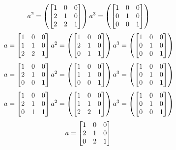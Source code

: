 \begin{mdframed}[style=darkAnswer,frametitle={Joe Starr}]
\begin{itemize}
{$$a^{ 2 }=\left( \begin{bmatrix}1&0&0\\2&1&0\\2&2&1\end{bmatrix} \right)
a^{ 3 }=\left( \begin{bmatrix}1&0&0\\0&1&0\\0&0&1\end{bmatrix} \right)
$$ $$
a= \begin{bmatrix}1&0&0\\1&1&0\\2&2&1\end{bmatrix} \\
a^{ 2 }=\left( \begin{bmatrix}1&0&0\\2&1&0\\0&1&1\end{bmatrix} \right)
a^{ 3 }=\left( \begin{bmatrix}1&0&0\\0&1&0\\0&0&1\end{bmatrix} \right)
$$ $$
a= \begin{bmatrix}1&0&0\\2&1&0\\0&0&1\end{bmatrix} \\
a^{ 2 }=\left( \begin{bmatrix}1&0&0\\1&1&0\\0&0&1\end{bmatrix} \right)
a^{ 3 }=\left( \begin{bmatrix}1&0&0\\0&1&0\\0&0&1\end{bmatrix} \right)
$$ $$
a= \begin{bmatrix}1&0&0\\2&1&0\\0&1&1\end{bmatrix} \\
a^{ 2 }=\left( \begin{bmatrix}1&0&0\\1&1&0\\2&2&1\end{bmatrix} \right)
a^{ 3 }=\left( \begin{bmatrix}1&0&0\\0&1&0\\0&0&1\end{bmatrix} \right)
$$ $$
a= \begin{bmatrix}1&0&0\\2&1&0\\0&2&1\end{bmatrix} \\
$$}
\end{itemize}
\end{mdframed}
